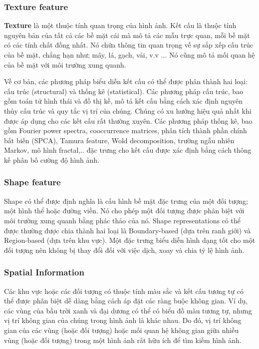 \documentclass[a4paper,14pt]{extreport}
\begin{document}
\subsubsection*{Texture feature}
\textbf{Texture} là một thuộc tính quan trọng của hình ảnh.
Kết cấu là thuộc tính nguyên bản của tất cả các bề mặt cái mà mô tả các mẫu trực quan, mỗi bề mặt có các tính chất đồng nhất.
Nó chứa thông tin quan trọng về sự sắp xếp cấu trúc của bề mặt, chẳng hạn như; mây, lá, gạch, vải, v.v ... 
Nó cũng mô tả mối quan hệ của bề mặt với môi trường xung quanh. \cite{features}
\par
Về cơ bản, các phương pháp biểu diễn kết cấu có thể được phân thành hai loại: cấu trúc (structural) và thống kê (statistical).
Các phương pháp cấu trúc, bao gồm toán tử hình thái và đồ thị kề, mô tả kết cấu bằng cách xác định nguyên thủy cấu trúc và quy tắc vị trí của chúng. 
Chúng có xu hướng hiệu quả nhất khi được áp dụng cho các kết cấu rất thường xuyên.
Các phương pháp thống kê, bao gồm Fourier power spectra,  cooccurrence matrices, phân tích thành phần chính bất biến (SPCA), Tamura feature, Wold decomposition, trường ngẫu nhiên Markov, mô hình fractal,.. đặc trưng cho kết cấu được xác định bằng cách thông kế  phân bố cường độ hình ảnh. \cite{class-tt}
\par 

\subsubsection*{Shape feature}
Shape có thể được định nghĩa là cấu hình bề mặt đặc trưng của một đối tượng; một hình thể hoặc đường viền. Nó cho phép một đối tượng được phân biệt với môi trường xung quanh bằng phác thảo của nó. Shape representations có thể được thường được chia thành hai loại là Boundary-based (dựa trên ranh giới) và  Region-based (dựa trên khu vực). Một đặc trưng biểu diễn hình dạng tốt cho một đối tượng nên không bị thay đổi đối với việc dịch, xoay và chia tỷ lệ hình ảnh.\cite{features}
\subsubsection*{Spatial Information}
Các khu vực hoặc các đối tượng có thuộc tính màu sắc và kết cấu tương tự có thể được phân biệt dễ dàng bằng cách áp đặt các ràng buộc không gian. Ví dụ, các vùng của bầu trời xanh và đại dương có thể có biểu đồ màu tương tự, 
nhưng vị trí không gian của chúng trong hình ảnh là khác nhau. Do đó, vị trí không gian của các vùng (hoặc đối tượng) 
hoặc mối quan hệ không gian giữa nhiều vùng (hoặc đối tượng) trong một hình ảnh rất hữu ích để tìm kiếm hình ảnh.\cite{spatical}
\par 
\end{document}
